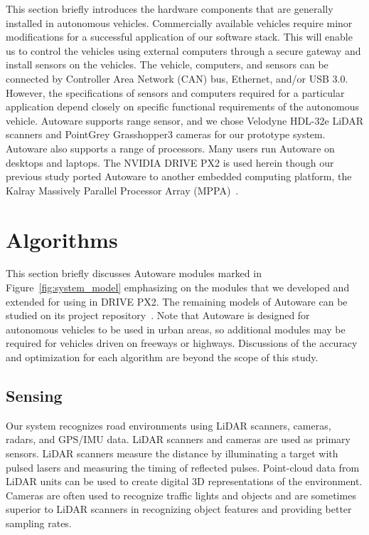 This section briefly introduces the hardware components that are generally installed in autonomous vehicles.
Commercially available vehicles require minor modifications for a successful application of
our software stack.
This will enable us to control the vehicles using external computers through
a secure gateway and install sensors on the vehicles.
The vehicle, computers, and sensors can be connected by Controller Area Network
(CAN) bus, Ethernet, and/or USB 3.0.
However, the specifications of sensors and computers required for a particular application depend closely on
specific functional requirements of the autonomous vehicle.
Autoware supports range sensor, and we chose Velodyne HDL-32e LiDAR scanners and PointGrey
Grasshopper3 cameras for our prototype system.
Autoware also supports a range of processors.
Many users run Autoware on desktops and laptops.
The NVIDIA DRIVE PX2 is used herein though our previous
study ported Autoware to another embedded computing platform,
the Kalray Massively Parallel Processor Array
(MPPA)~\cite{yuya2017exploring}. 

\section{Algorithms}
\label{sec:algorithms}

This section briefly discusses Autoware modules marked in
Figure~\ref{fig:system_model} emphasizing on the modules
that we developed and extended for using in DRIVE PX2.
The remaining models of Autoware can be studied on its
project repository~\cite{autoware}.
Note that Autoware is designed for autonomous vehicles to be used in urban areas, so additional modules
may be required for vehicles driven on freeways or highways.
Discussions of the accuracy and optimization for each algorithm are beyond
the scope of this study.

\subsection{Sensing}
\label{sec:sensing}
Our system recognizes road environments using
LiDAR scanners, cameras, radars, and GPS/IMU data.
LiDAR scanners and cameras are used as primary sensors.
LiDAR scanners measure the distance by illuminating a
target with pulsed lasers and measuring the timing of reflected pulses.
Point-cloud data from LiDAR units can be used to create digital
3D representations of the environment.
Cameras are often used to recognize traffic lights and objects and are sometimes
superior to LiDAR scanners in recognizing object features and providing better sampling rates.

